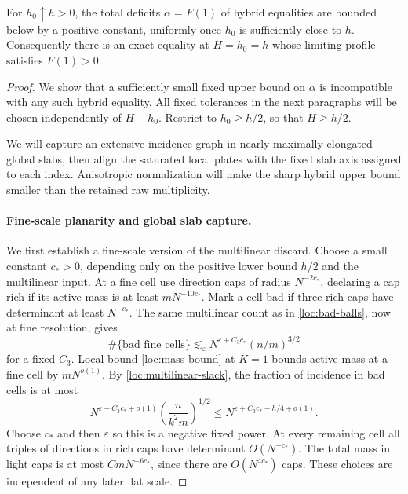 \begin{lemma}
\label{lem:positive-deficit}
For $h_0\uparrow h>0$, the total deficits $\alpha=F(1)$ of hybrid
equalities are bounded below by a positive constant, uniformly
once $h_0$ is sufficiently close to $h$.  Consequently there is
an exact equality at $H=h_0=h$ whose limiting profile satisfies
$F(1)>0$.
\end{lemma}

\begin{proof}
We show that a sufficiently small fixed upper bound on $\alpha$
is incompatible with any such hybrid equality.  All fixed
tolerances in the next paragraphs will be chosen independently
of $H-h_0$.  Restrict to $h_0\geq h/2$, so that $H\geq h/2$.

We will capture an extensive incidence graph in nearly maximally elongated
global slabs, then align the saturated local plates with the fixed slab axis
assigned to each index. Anisotropic normalization will make the sharp hybrid
upper bound smaller than the retained raw multiplicity.

\paragraph{Fine-scale planarity and global slab capture.}
We first establish a fine-scale version of the multilinear
discard.  Choose a small constant $c_*>0$, depending only on the
positive lower bound $h/2$ and the multilinear input.  At a fine
cell use direction caps of radius $N^{-2c_*}$, declaring a cap
rich if its active mass is at least $mN^{-10c_*}$.  Mark a cell
bad if three rich caps have determinant at least $N^{-c_*}$.
The same multilinear count as in \eqref{loc:bad-balls}, now at
fine resolution, gives
\[
 \#\{\text{bad fine cells}\}
 \lesssim_\varepsilon
 N^{\varepsilon+C_3c_*}(n/m)^{3/2}
\]
for a fixed $C_3$.  Local bound \eqref{loc:mass-bound} at $K=1$
bounds active mass at a fine cell by $mN^{o(1)}$.  By
\eqref{loc:multilinear-slack}, the fraction of incidence in bad
cells is at most
\[
 N^{\varepsilon+C_3c_*+o(1)}
 \left(\frac{n}{k^2m}\right)^{1/2}
 \leq N^{\varepsilon+C_3c_*-h/4+o(1)}.
\]
Choose $c_*$ and then $\varepsilon$ so this is a negative fixed
power.  At every remaining cell all triples of directions in
rich caps have determinant $O(N^{-c_*})$.  The total mass in
light caps is at most $CmN^{-6c_*}$, since there are
$O(N^{4c_*})$ caps.  These choices are independent of any later
flat scale.


\end{proof}
